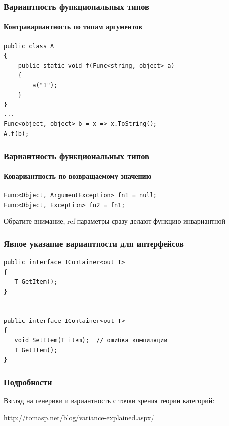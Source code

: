 \documentclass[xetex,mathserif,serif]{beamer}
\begin{document}
	\begin{frame}[fragile]
		\frametitle{Вариантность функциональных типов}
		\framesubtitle{Контравариантность по типам аргументов}
		\begin{verbatim}
public class A
{
    public static void f(Func<string, object> a)
    {
        a("1");
    }
}
...
Func<object, object> b = x => x.ToString();
A.f(b);
		\end{verbatim}
	\end{frame}

	\begin{frame}[fragile]
		\frametitle{Вариантность функциональных типов}
		\framesubtitle{Ковариантность по возвращаемому значению}
		\begin{verbatim}
Func<Object, ArgumentException> fn1 = null;
Func<Object, Exception> fn2 = fn1;
		\end{verbatim}

		Обратите внимание, ref-параметры сразу делают функцию инвариантной
	\end{frame}

	\begin{frame}[fragile]
		\frametitle{Явное указание вариантности для интерфейсов}
		\begin{verbatim}
public interface IContainer<out T>
{
   T GetItem();
}


public interface IContainer<out T>
{
   void SetItem(T item);  // ошибка компиляции
   T GetItem();
}
		\end{verbatim}
	\end{frame}

	\begin{frame}
		\frametitle{Подробности}
		Взгляд на генерики и вариантность с точки зрения теории категорий:

		\href{http://tomasp.net/blog/variance-explained.aspx/}{http://tomasp.net/blog/variance-explained.aspx/}
	\end{frame}
\end{document}
